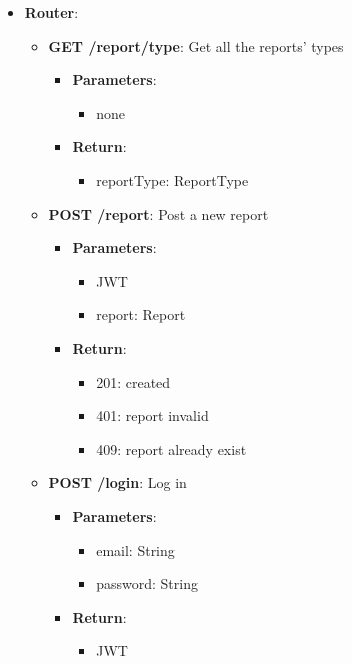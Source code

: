 \documentclass{article}
\begin{document}
\begin{itemize}
	\item \textbf{Router}:
		\begin{itemize}
			\item \textbf{GET /report/type}:
				Get all the reports' types
				\begin{itemize}
					\item \textbf{Parameters}:
						\begin{itemize}
							\item none
						\end{itemize}
					\item \textbf{Return}:
						\begin{itemize}
							\item reportType: ReportType
						\end{itemize}
				\end{itemize}
			\item \textbf{POST /report}:
				Post a new report
				\begin{itemize}
					\item \textbf{Parameters}:
						\begin{itemize}
							\item JWT
							\item report: Report
						\end{itemize}
					\item \textbf{Return}:
						\begin{itemize}
							\item 201: created
							\item 401: report invalid
							\item 409: report already exist
						\end{itemize}
				\end{itemize}
			\item \textbf{POST /login}:
				Log in
				\begin{itemize}
					\item \textbf{Parameters}:
						\begin{itemize}
							\item email: String
							\item password: String
						\end{itemize}
					\item \textbf{Return}:
						\begin{itemize}
							\item JWT
						\end{itemize}
				\end{itemize}

\end{itemize}
\end{itemize}
\end{document}
